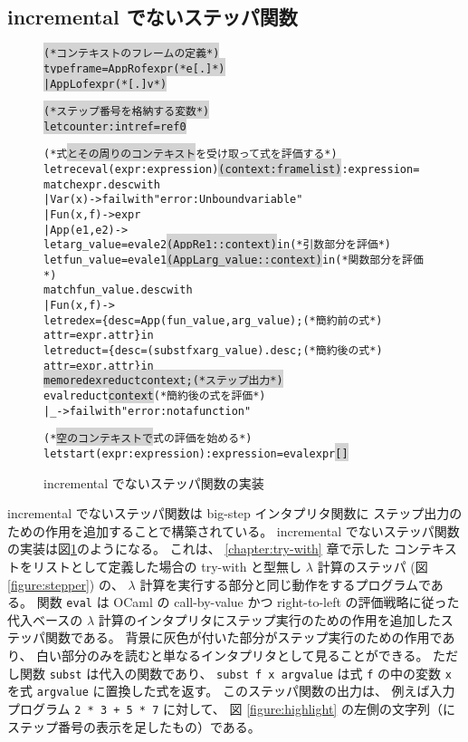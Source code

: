 \subsection{incremental でないステッパ関数}

\begin{figure}[t]
\begin{spacing}{0.8}
  \begin{alltt}
\colorbox{lightgray}{(* コンテキストのフレームの定義 *)}
\colorbox{lightgray}{type frame = AppR of expr  (* e [.] *)}
\colorbox{lightgray}{           | AppL of expr  (* [.] v *)}

\colorbox{lightgray}{(* ステップ番号を格納する変数 *)}
\colorbox{lightgray}{let counter : int ref = ref 0}

(* 式\colorbox{lightgray}{とその周りのコンテキスト}を受け取って式を評価する *)
let rec eval (expr : expression) \colorbox{lightgray}{(context : frame list)} : expression =
  match expr.desc with
    | Var (x) -> failwith "error: Unbound variable"
    | Fun (x, f) -> expr
    | App (e1, e2) ->
      let arg_value = eval e2 \colorbox{lightgray}{(AppR e1 :: context)} in      (* 引数部分を評価 *)
      let fun_value = eval e1 \colorbox{lightgray}{(AppL arg_value :: context)} in(*関数部分を評価 *)
      match fun_value.desc with
        | Fun (x, f) ->
          let redex = \{desc = App (fun_value, arg_value);       (* 簡約前の式 *)
                      attr = expr.attr\} in
          let reduct = \{desc = (subst f x arg_value).desc ;     (* 簡約後の式 *)
                        attr = expr.attr\} in
          \colorbox{lightgray}{memo redex reduct context;                          (* ステップ出力 *)}
          eval reduct \colorbox{lightgray}{context}                             (* 簡約後の式を評価 *)
        | _ -> failwith "error: not a function"

(* \colorbox{lightgray}{空のコンテキストで}式の評価を始める *)
let start (expr : expression) : expression = eval expr \colorbox{lightgray}{[]}
\end{alltt}
\end{spacing}
\caption{incremental でないステッパ関数の実装}
\label{figure:old-stepper}
\end{figure}

incremental でないステッパ関数は big-step インタプリタ関数に
ステップ出力のための作用を追加することで構築されている。
incremental でないステッパ関数の実装は図\ref{figure:old-stepper}のようになる。
これは、 \ref{chapter:try-with} 章で示した
コンテキストをリストとして定義した場合の
try-with と型無し $\lambda$ 計算のステッパ (図 \ref{figure:stepper}) の、
$\lambda$ 計算を実行する部分と同じ動作をするプログラムである。
関数 \texttt{eval} は OCaml の call-by-value かつ right-to-left
の評価戦略に従った代入ベースの $\lambda$
計算のインタプリタにステップ実行のための作用を追加したステッパ関数である。
背景に灰色が付いた部分がステップ実行のための作用であり、
白い部分のみを読むと単なるインタプリタとして見ることができる。
ただし関数 \texttt{subst} は代入の関数であり、
\texttt{subst f x arg\US value} は式 \texttt{f} の中の変数
\texttt{x} を式 \texttt{arg\US value} に置換した式を返す。
このステッパ関数の出力は、
例えば入力プログラム \texttt{2 * 3 + 5 * 7} に対して、
図 \ref{figure:highlight} の左側の文字列（にステップ番号の表示を足したもの）である。

